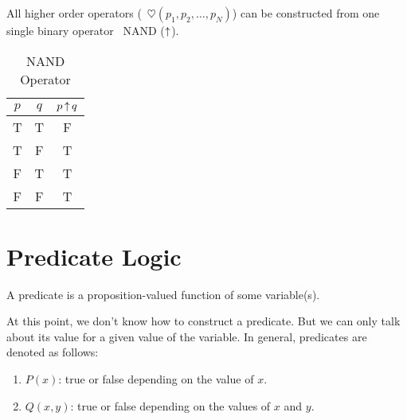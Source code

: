 \begin{remark}
	All higher order operators (\eg\ \(\heartsuit(p_1, p_2, \ldots, p_N)\)) can be constructed from one single binary operator \ie\ NAND (\(\operatorname{\uparrow}\)).
	\begin{table}[H]
		\centering
		\def\arraystretch{1.15}\tabcolsep=10pt
		\begin{tabular}{|c|c||c|}
			\hline
			\(p\) & \(q\) & \(p \operatorname{\uparrow} q\) \\
			\hline
			T     & T     & F              \\
			T     & F     & T              \\
			F     & T     & T              \\
			F     & F     & T              \\
			\hline
		\end{tabular}
		\caption{NAND Operator}
	\end{table}
\end{remark}

\section{Predicate Logic}

\begin{definition}[Predicate]
	A predicate is a proposition-valued function of some variable(s).
\end{definition}

\begin{example}
	At this point, we don't know how to construct a predicate. But we can only talk about its value for a given value of the variable. In general, predicates are denoted as follows:
	\begin{enumerate}
		\item \(P(x)\): true or false depending on the value of \(x\).
		\item \(Q(x, y)\): true or false depending on the values of \(x\) and \(y\).
	\end{enumerate}
\end{example}


